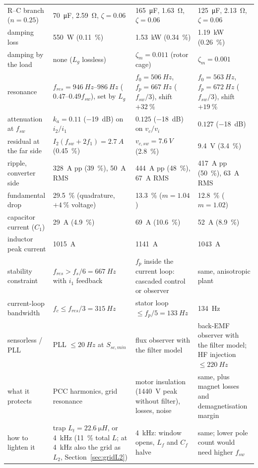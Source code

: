 \documentclass[10pt,a4paper]{scrartcl}
\newcommand{\fsw}{f_{sw}}
\newcommand{\fres}{f_{res}}
\newcommand{\Cf}{C_{f}}
\newcommand{\Lf}{L_{f}}
\newcommand{\Lg}{L_{g}}
\begin{document}
\begin{onehalfspace}
\begin{table}[htb]
\begin{onehalfspace}
\begin{tabular}{@{}l p{3.9cm} p{3.9cm} p{3.9cm}@{}}
R--C branch ($n = 0.25$) & \SI{70}{\micro F}, \SI{2.59}{\ohm}, $\zeta = 0.06$ & \SI{165}{\micro F}, \SI{1.63}{\ohm}, $\zeta = 0.06$ & \SI{125}{\micro F}, \SI{2.13}{\ohm}, $\zeta = 0.06$ \\
damping loss & \SI{550}{W} (\SI{0.11}{\percent}) & \SI{1.53}{kW} (\SI{0.34}{\percent}) & \SI{1.19}{kW} (\SI{0.26}{\percent}) \\
damping by the load & none ($\Lg$ lossless) & $\zeta_m = 0.011$ (rotor cage) & $\zeta_m = 0.001$ \\
resonance & $\fres = \SIrange{946}{986}{Hz}$ ($0.47$--$0.49\fsw$), set by $\Lg$ & $f_0 = \SI{506}{Hz}$, $f_p = \SI{667}{Hz}$ ($\fsw/3$), shift $+\SI{32}{\percent}$ & $f_0 = \SI{563}{Hz}$, $f_p = \SI{672}{Hz}$ ($\fsw/3$), shift $+\SI{19}{\percent}$ \\
attenuation at $\fsw$ & $k_a = 0.11$ (\SI{-19}{dB}) on $i_2/i_1$ & $0.125$ (\SI{-18}{dB}) on $v_c/v_i$ & $0.127$ (\SI{-18}{dB}) \\
residual at the far side & $I_2(\fsw + 2f_1) = \SI{2.7}{A}$ (\SI{0.45}{\percent}) & $v_{c,sw} = \SI{7.6}{V}$ (\SI{2.8}{\percent}) & \SI{9.4}{V} (\SI{3.4}{\percent}) \\
ripple, converter side & \SI{328}{A} pp (\SI{39}{\percent}), \SI{50}{A} RMS & \SI{444}{A} pp (\SI{48}{\percent}), \SI{67}{A} RMS & \SI{417}{A} pp (\SI{50}{\percent}), \SI{63}{A} RMS \\
fundamental drop & \SI{29.5}{\percent} (quadrature, $+\SI{4}{\percent}$ voltage) & \SI{13.3}{\percent} ($m = 1.04$) & \SI{12.8}{\percent} ($m = 1.02$) \\
capacitor current ($C_1$) & \SI{29}{A} (\SI{4.9}{\percent}) & \SI{69}{A} (\SI{10.6}{\percent}) & \SI{52}{A} (\SI{8.9}{\percent}) \\
inductor peak current & \SI{1015}{A} & \SI{1141}{A} & \SI{1043}{A} \\
stability constraint & $\fres > f_s/6 = \SI{667}{Hz}$ with $i_1$ feedback & $f_p$ inside the current loop: cascaded control or observer & same, anisotropic plant \\
current-loop bandwidth & $f_c \le \fres/3 = \SI{315}{Hz}$ & stator loop $\le f_p/5 = \SI{133}{Hz}$ & \SI{134}{Hz} \\
sensorless / PLL & PLL $\le \SI{20}{Hz}$ at $S_{sc,min}$ & flux observer with the filter model & back-EMF observer with the filter model; HF injection $\le \SI{220}{Hz}$ \\
what it protects & PCC harmonics, grid resonance & motor insulation (\SI{1440}{V} peak without filter), losses, noise & same, plus magnet losses and demagnetisation margin \\
how to lighten it & trap $L_t = \SI{22.6}{\micro H}$, or \SI{4}{kHz} (\SI{11}{\percent} total $L$; at \SI{4}{kHz} also the grid as $L_2$, Section~\ref{sec:gridL2}) & \SI{4}{kHz}: window opens, $\Lf$ and $\Cf$ halve & same; lower pole count would need higher $\fsw$ \\
\bottomrule
\end{tabular}
\end{onehalfspace}
\end{table}


\end{onehalfspace}
\end{document}
